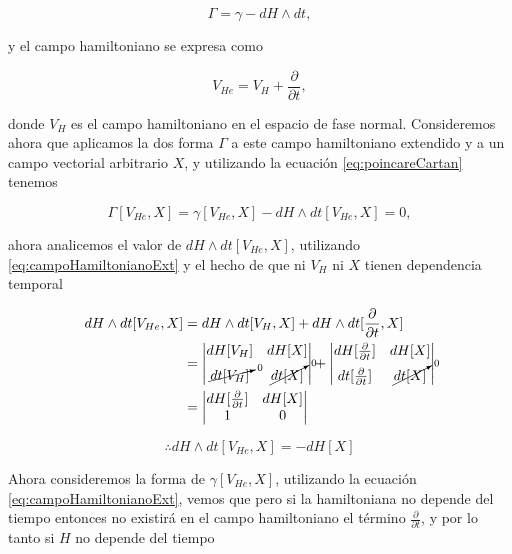 \documentclass[a4paper,10pt]{article}
\numberwithin{equation}{section}
\begin{document}
\begin{equation}
 \Gamma = \gamma - dH \wedge dt,
 \label{eq:poincareCartan}
\end{equation}

y el campo hamiltoniano se expresa como 

\begin{equation}
 V_{He} = V_H + \frac{\partial}{\partial t},
 \label{eq:campoHamiltonianoExt}
\end{equation}

donde $V_H$ es el campo hamiltoniano en el espacio de fase normal. Consideremos ahora 
que aplicamos la dos forma $\Gamma$ a este campo hamiltoniano extendido y a un campo 
vectorial arbitrario $X$, y utilizando la ecuación \eqref{eq:poincareCartan} tenemos 

\begin{equation}
 \Gamma[V_{He},X] = \gamma[V_{He},X] - dH \wedge dt[V_{He},X] = 0,
 \label{eq:equivalencia}
\end{equation}

ahora analicemos el valor de $dH \wedge dt[V_{He},X]$, utilizando \eqref{eq:campoHamiltonianoExt}
y el hecho de que ni $V_H$ ni $X$ tienen dependencia temporal

\begin{align*}
  dH \wedge dt[V_{He},X] &= dH \wedge dt[V_H,X] + dH \wedge dt[\frac{\partial}{\partial t},X] \\
  &= \left|\begin{matrix}
       dH[V_H] & dH[X] \\
       \cancelto{0}{dt[V_H]} & \cancelto{0}{dt[X]}
      \end{matrix}
      \right| + 
      \left|\begin{matrix}
       dH[\frac{\partial}{\partial t}] & dH[X] \\
       dt[\frac{\partial}{\partial t}] & \cancelto{0}{dt[X]}
      \end{matrix}
      \right| \\
  &= \left|\begin{matrix}
       dH[\frac{\partial}{\partial t}] & dH[X] \\
       1 & 0
      \end{matrix}
      \right|
\end{align*}

\begin{equation}
 \therefore dH \wedge dt[V_{He},X] = - dH[X]
\end{equation}

Ahora consideremos la forma de $\gamma[V_{He},X]$, utilizando la ecuación \eqref{eq:campoHamiltonianoExt}, 
vemos que pero si la hamiltoniana no depende del tiempo entonces no existirá en el campo hamiltoniano el 
término $\frac{\partial}{\partial t}$, y por lo tanto si $H$ no depende 
del tiempo
\end{document}
